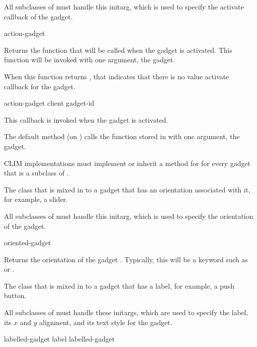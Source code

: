 
All subclasses of  must handle this initarg, which is used to
specify the activate callback of the gadget.

 {action-gadget}

Returns the function that will be called when the gadget is activated.  This
function will be invoked with one argument, the gadget.

When this function returns , that indicates that there is no value
activate callback for the gadget.

 {action-gadget client gadget-id}

This callback is invoked when the gadget is activated.

The default method (on ) calls the function stored in
 with one argument, the gadget.

CLIM implementations must implement or inherit a method for
 for every gadget that is a subclass of
.



The class that is mixed in to a gadget that has an orientation associated with
it, for example, a slider.


All subclasses of  must handle this initarg, which is used
to specify the orientation of the gadget.

 {oriented-gadget}

Returns the orientation of the gadget .  Typically, this
will be a keyword such as  or .



The class that is mixed in to a gadget that has a label, for example, a push
button.


All subclasses of  must handle these initargs, which are
used to specify the label, its $x$ and $y$ alignment, and its text style for the
gadget.

 {labelled-gadget}
 {label labelled-gadget}

